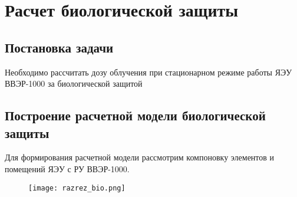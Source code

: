 \section{Расчет биологической защиты} %
\subsection{Постановка задачи}
Необходимо рассчитать дозу облучения при стационарном режиме работы ЯЭУ ВВЭР-1000 за биологической защитой

\subsection{Построение расчетной модели биологической защиты}
Для формирования расчетной модели рассмотрим компоновку элементов и помещений ЯЭУ с РУ ВВЭР-1000.

\begin{figure}[H]
	\begin{center}
		\texttt{[image: razrez\_bio.png]}
		\caption{}
		\label{pic:razrez_bio} %
	\end{center}
\end{figure}